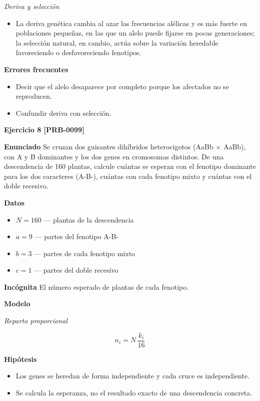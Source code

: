 \documentclass{book}
\begin{document}
\noindent\textit{Deriva y selección}
\begin{itemize}
\item La deriva genética cambia al azar las frecuencias alélicas y es más fuerte en poblaciones pequeñas, en las que un alelo puede fijarse en pocas generaciones; la selección natural, en cambio, actúa sobre la variación heredable favoreciendo o desfavoreciendo fenotipos.
\end{itemize}

\noindent\textbf{Errores frecuentes}
\begin{itemize}
\item Decir que el alelo desaparece por completo porque los afectados no se reproducen.
\item Confundir deriva con selección.
\end{itemize}

\noindent\textbf{Ejercicio 8 [PRB-0099]}

\noindent\textbf{Enunciado}
Se cruzan dos guisantes dihíbridos heterocigotos (AaBb \(\times\) AaBb), con A y B dominantes y los dos genes en cromosomas distintos. De una descendencia de 160 plantas, calcule cuántas se esperan con el fenotipo dominante para los dos caracteres (A-B-), cuántas con cada fenotipo mixto y cuántas con el doble recesivo.


\noindent\textbf{Datos}
\begin{itemize}
\item $N = 160$ — plantas de la descendencia
\item $a = 9$ — partes del fenotipo A-B-
\item $b = 3$ — partes de cada fenotipo mixto
\item $c = 1$ — partes del doble recesivo
\end{itemize}

\noindent\textbf{Incógnita}
El número esperado de plantas de cada fenotipo.


\noindent\textbf{Modelo}

\noindent\textit{Reparto proporcional}

\[
n_i = N\,\frac{k_i}{16}
\]

\noindent\textbf{Hipótesis}
\begin{itemize}
\item Los genes se heredan de forma independiente y cada cruce es independiente.
\item Se calcula la esperanza, no el resultado exacto de una descendencia concreta.
\end{itemize}
\end{document}
